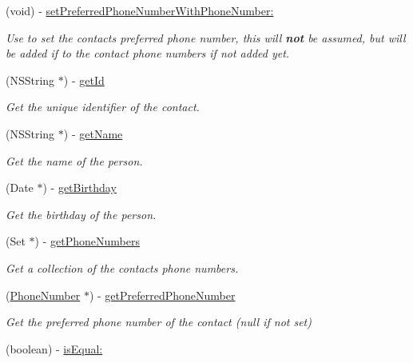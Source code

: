 \begin{DoxyCompactItemize}
(void) -\/ \hyperlink{interface_contact_info_a24ce0f58618d37d4ef30f3a75d3d838c}{set\+Preferred\+Phone\+Number\+With\+Phone\+Number\+:}
\begin{DoxyCompactList}\small\item\em Use to set the contact\textquotesingle{}s preferred phone number, this will {\bfseries not} be assumed, but will be added if to the contact phone numbers if not added yet. \end{DoxyCompactList}\item 
(N\+S\+String $\ast$) -\/ \hyperlink{interface_contact_info_a1c2fef05ccedc862c74411266b6cd5e5}{get\+Id}
\begin{DoxyCompactList}\small\item\em Get the unique identifier of the contact. \end{DoxyCompactList}\item 
(N\+S\+String $\ast$) -\/ \hyperlink{interface_contact_info_a9aa8b428a7ee940b1db38de715ba74a7}{get\+Name}
\begin{DoxyCompactList}\small\item\em Get the name of the person. \end{DoxyCompactList}\item 
(Date $\ast$) -\/ \hyperlink{interface_contact_info_aee6448a5ecdbbeacbbfeb5e35317fb9d}{get\+Birthday}
\begin{DoxyCompactList}\small\item\em Get the birthday of the person. \end{DoxyCompactList}\item 
(Set $\ast$) -\/ \hyperlink{interface_contact_info_a8d3f32621adcf075b8f4569445ad9fe6}{get\+Phone\+Numbers}
\begin{DoxyCompactList}\small\item\em Get a collection of the contact\textquotesingle{}s phone numbers. \end{DoxyCompactList}\item 
(\hyperlink{interface_phone_number}{Phone\+Number} $\ast$) -\/ \hyperlink{interface_contact_info_ae5de9b9e017fa48efd8dcc30205179d1}{get\+Preferred\+Phone\+Number}
\begin{DoxyCompactList}\small\item\em Get the preferred phone number of the contact (null if not set) \end{DoxyCompactList}\item 
(boolean) -\/ \hyperlink{interface_contact_info_a33026f641c756a1d263dd15e270c9e54}{is\+Equal\+:}
\item 

\end{DoxyCompactItemize}
